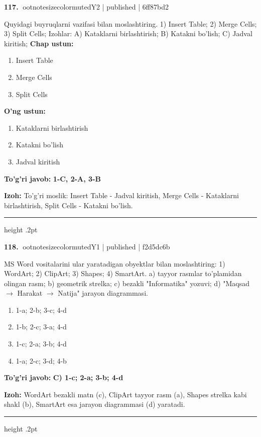 \documentclass[10pt,a4paper]{article}
\begin{document}
\textbf{\color{ink}117.} {ootnotesizecolor{muted}Y2 | published | 6ff87bd2}
\par
Quyidagi buyruqlarni vazifasi bilan moslashtiring.  1) Insert Table;  2) Merge Cells;  3) Split Cells;  Izohlar: A) Kataklarni birlashtirish;  B) Katakni bo'lish;  C) Jadval kiritish;
\textbf{Chap ustun:}\begin{enumerate}[label=\arabic*),leftmargin=9mm]
\item Insert Table
\item Merge Cells
\item Split Cells
\end{enumerate}
\textbf{O'ng ustun:}\begin{enumerate}[label=\Alph*),leftmargin=9mm]
\item Kataklarni birlashtirish
\item Katakni bo'lish
\item Jadval kiritish
\end{enumerate}
\begin{tcolorbox}[enhanced,breakable,colback=teal!4,colframe=teal!55!black,boxrule=0.45pt,arc=1.2mm,left=2.8mm,right=2.8mm,top=2mm,bottom=2mm]
\textbf{\color{teal}To'g'ri javob:} \textbf{1-C, 2-A, 3-B}
\par\smallskip
\textbf{Izoh:} To'g'ri moslik: Insert Table - Jadval kiritish, Merge Cells - Kataklarni birlashtirish, Split Cells - Katakni bo'lish.
\end{tcolorbox}
\vspace{2mm}\hrule height .2pt\vspace{2mm}

\textbf{\color{ink}118.} {ootnotesizecolor{muted}Y1 | published | f2d5dc6b}
\par
MS Word vositalarini ular yaratadigan obyektlar bilan moslashtiring: 1) WordArt; 2) ClipArt; 3) Shapes; 4) SmartArt. a) tayyor rasmlar to'plamidan olingan rasm; b) geometrik strelka; c) bezakli "Informatika" yozuvi; d) "Maqsad \ensuremath{\rightarrow} Harakat \ensuremath{\rightarrow} Natija" jarayon diagrammasi.
\begin{enumerate}[label=\Alph*),leftmargin=9mm]
\item 1-a; 2-b; 3-c; 4-d
\item 1-b; 2-c; 3-a; 4-d
\item 1-c; 2-a; 3-b; 4-d
\item 1-a; 2-c; 3-d; 4-b
\end{enumerate}
\begin{tcolorbox}[enhanced,breakable,colback=teal!4,colframe=teal!55!black,boxrule=0.45pt,arc=1.2mm,left=2.8mm,right=2.8mm,top=2mm,bottom=2mm]
\textbf{\color{teal}To'g'ri javob:} \textbf{C) 1-c; 2-a; 3-b; 4-d}
\par\smallskip
\textbf{Izoh:} WordArt bezakli matn (c), ClipArt tayyor rasm (a), Shapes strelka kabi shakl (b), SmartArt esa jarayon diagrammasi (d) yaratadi.
\end{tcolorbox}
\vspace{2mm}\hrule height .2pt\vspace{2mm}
\end{document}
